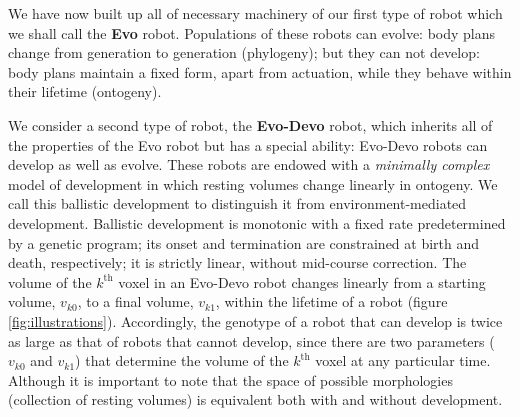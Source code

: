We have now built up all of necessary machinery of our first type of robot which we shall call the \textbf{Evo} robot.
Populations of these robots can evolve:
body plans change from generation to generation (phylogeny); but they can not develop: body plans maintain a fixed form, apart from actuation, while they behave within their lifetime (ontogeny).

We consider a second type of robot, the \textbf{Evo-Devo} robot, which inherits all of the properties of the Evo robot but has a special ability: Evo-Devo robots can develop as well as evolve.
These robots are endowed with a \textit{minimally complex} model of development in which resting volumes change linearly in ontogeny. We call this ballistic development to distinguish it from environment-mediated development.
Ballistic development is monotonic with a fixed rate predetermined by a genetic program; its onset and termination are constrained at birth and death, respectively; it is strictly linear, without mid-course correction.
The volume of the $k^{\text{th}}$ voxel in an Evo-Devo robot changes linearly from a starting volume, $v_{k0}$, to a final volume, $v_{k1}$, within the lifetime of a robot (figure \ref{fig:illustrations}). 
Accordingly, the genotype of a robot that can develop is twice as large as that of robots that cannot develop, since there are two parameters ($v_{k0}$ and $v_{k1}$) that determine the volume of the $k^{\text{th}}$ voxel at any particular time. 
Although it is important to note that the space of possible morphologies (collection of resting volumes) is equivalent both with and without development.


